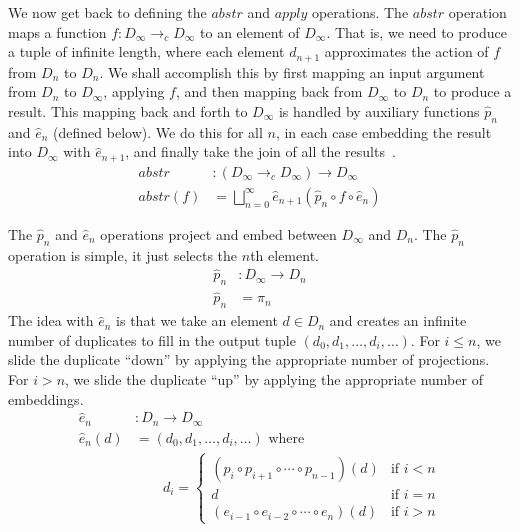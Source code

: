\documentclass{tufte-handout}
\begin{document}
We now get back to defining the $\mathit{abstr}$ and $\mathit{apply}$
operations. The $\mathit{abstr}$ operation maps a function $f :
D_{\infty} \to_c D_{\infty}$ to an element of $D_\infty$.  That is, we
need to produce a tuple of infinite length, where each element
$d_{n+1}$ approximates the action of $f$ from $D_n$ to $D_n$.
%
We shall accomplish this by first mapping an input argument from $D_n$
to $D_\infty$, applying $f$, and then mapping back from $D_\infty$ to
$D_n$ to produce a result. This mapping back and forth to $D_\infty$
is handled by auxiliary functions $\hat{p}_n$ and $\hat{e}_n$ (defined
below).  We do this for all $n$, in each case embedding the result
into $D_\infty$ with $\hat{e}_{n+1}$, and finally take the join of all
the results~\citep{Scott:1971aa,barendregt84:_lambda_calculus}.
\begin{align*}
 \mathit{abstr} &: (D_{\infty} \to_c D_{\infty}) \to D_{\infty}\\
 \mathit{abstr}(f) &= \bigsqcup_{n=0}^{\infty} \hat{e}_{n+1}(\hat{p}_n \circ f \circ \hat{e}_n)
\end{align*}

The $\hat{p}_n$ and $\hat{e}_n$ operations project and embed between
$D_\infty$ and $D_n$.  The $\hat{p}_n$ operation is simple, it just
selects the $n$th element.
\begin{align*}
 \hat{p}_n &: D_\infty \to D_n \\
 \hat{p}_n &= \pi_n
\end{align*}
The idea with $\hat{e}_n$ is that we take an element $d \in D_n$ and
creates an infinite number of duplicates to fill in the output tuple
$(d_0, d_1, \ldots, d_i, \ldots)$. For $i \leq n$, we slide the
duplicate ``down'' by applying the appropriate number of projections.
For $i > n$, we slide the duplicate ``up'' by applying the appropriate
number of embeddings.
\begin{align*}
 \hat{e}_n &: D_n \to D_\infty \\
 \hat{e}_n(d) &= (d_0, d_1, \ldots, d_i, \ldots) \text{ where} \\
  & \qquad d_i = 
  \begin{cases}
    (p_i \circ p_{i+1} \circ \cdots \circ p_{n-1})(d) & \text{if } i < n \\
    d & \text{if } i = n \\
    (e_{i-1} \circ e_{i-2} \circ \cdots \circ e_n)(d) & \text{if } i > n
  \end{cases}
\end{align*}
\end{document}
